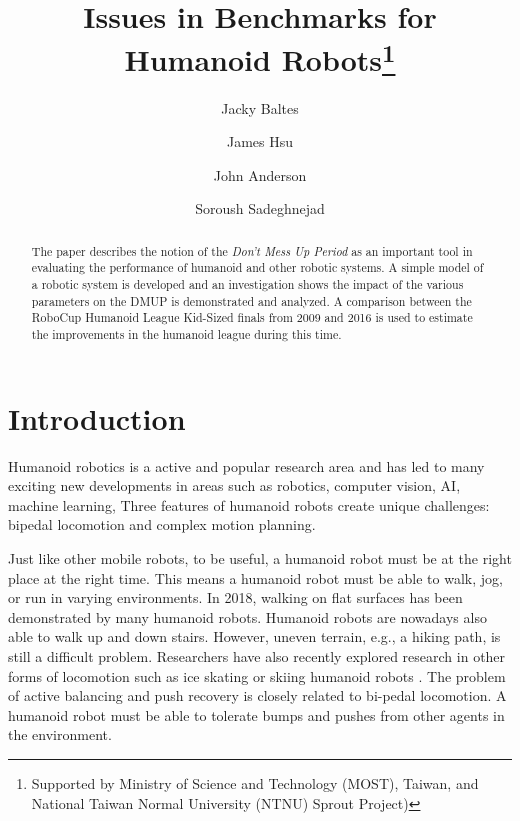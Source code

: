 \documentclass[runningheads]{llncs}
\begin{document}
%
\title{Issues in Benchmarks for Humanoid Robots\thanks{Supported by Ministry of Science and Technology (MOST), Taiwan, and National Taiwan Normal University (NTNU) Sprout Project)}}
%
%
\author{Jacky Baltes 
\and
James Hsu 
\and
John Anderson
\and
Soroush Sadeghnejad
}
%
%


%
\maketitle              %
%
\begin{abstract}
The paper describes the notion of the \emph{Don't Mess Up Period} as an important tool in evaluating the performance of humanoid and other robotic systems.
A simple model of a robotic system is developed and an investigation shows the impact of the various parameters on the DMUP is demonstrated and analyzed.
A comparison between the RoboCup Humanoid League Kid-Sized finals from 2009 and 2016 is used to estimate the improvements in the humanoid league during this time.

\end{abstract}
%
%
%
\section{Introduction}

Humanoid robotics is a active and popular research area and has led to many exciting new developments in areas such as robotics, computer vision, AI, machine learning, 
Three features of humanoid robots create unique challenges: bipedal locomotion and complex motion planning.

Just like other mobile robots, to be useful, a humanoid robot must be at the right place at the right time.
This means a humanoid robot must be able to walk, jog, or run in varying environments. 
In 2018, walking on flat surfaces has been demonstrated by many humanoid robots.
Humanoid robots are nowadays also able to walk up and down stairs.
However, uneven terrain, e.g., a hiking path, is still a difficult problem.
Researchers have also recently explored research in other forms of locomotion such as ice skating or skiing humanoid robots \cite{tu2017active}.
The problem of active balancing and push recovery is closely related to bi-pedal locomotion.
A humanoid robot must be able to tolerate bumps and pushes from other agents in the environment.
\end{document}
